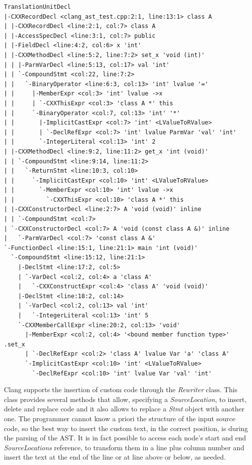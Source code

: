 \documentclass[a4paper,12pt,oneside]{book}
\begin{document}
\begin{lstlisting}[language=AST, caption=Clang AST of the simple code., label=ast]
TranslationUnitDecl
|-CXXRecordDecl <clang_ast_test.cpp:2:1, line:13:1> class A
| |-CXXRecordDecl <line:2:1, col:7> class A
| |-AccessSpecDecl <line:3:1, col:7> public
| |-FieldDecl <line:4:2, col:6> x 'int'
| |-CXXMethodDecl <line:5:2, line:7:2> set_x 'void (int)'
| | |-ParmVarDecl <line:5:13, col:17> val 'int'
| | `-CompoundStmt <col:22, line:7:2>
| |   `-BinaryOperator <line:6:3, col:13> 'int' lvalue '='
| |     |-MemberExpr <col:3> 'int' lvalue ->x
| |     | `-CXXThisExpr <col:3> 'class A *' this
| |     `-BinaryOperator <col:7, col:13> 'int' '*'
| |       |-ImplicitCastExpr <col:7> 'int' <LValueToRValue>
| |       | `-DeclRefExpr <col:7> 'int' lvalue ParmVar 'val' 'int'
| |       `-IntegerLiteral <col:13> 'int' 2
| |-CXXMethodDecl <line:9:2, line:11:2> get_x 'int (void)'
| | `-CompoundStmt <line:9:14, line:11:2>
| |   `-ReturnStmt <line:10:3, col:10>
| |     `-ImplicitCastExpr <col:10> 'int' <LValueToRValue>
| |       `-MemberExpr <col:10> 'int' lvalue ->x
| |         `-CXXThisExpr <col:10> 'class A *' this
| |-CXXConstructorDecl <line:2:7> A 'void (void)' inline
| | `-CompoundStmt <col:7>
| `-CXXConstructorDecl <col:7> A 'void (const class A &)' inline
|   `-ParmVarDecl <col:7> 'const class A &'
`-FunctionDecl <line:15:1, line:21:1> main 'int (void)'
  `-CompoundStmt <line:15:12, line:21:1>
    |-DeclStmt <line:17:2, col:5>
    | `-VarDecl <col:2, col:4> a 'class A'
    |   `-CXXConstructExpr <col:4> 'class A' 'void (void)'
    |-DeclStmt <line:18:2, col:14>
    | `-VarDecl <col:2, col:13> val 'int'
    |   `-IntegerLiteral <col:13> 'int' 5
    `-CXXMemberCallExpr <line:20:2, col:13> 'void'
      |-MemberExpr <col:2, col:4> '<bound member function type>' .set_x
      | `-DeclRefExpr <col:2> 'class A' lvalue Var 'a' 'class A'
      `-ImplicitCastExpr <col:10> 'int' <LValueToRValue>
        `-DeclRefExpr <col:10> 'int' lvalue Var 'val' 'int'
\end{lstlisting}


Clang supports the insertion of custom code through the \emph{Rewriter} class. This class provides several methods that allow, specifying a \emph{SourceLocation}, to insert, delete and replace code and it also allows to replace a \emph{Stmt} object with another one. The programmer cannot know a priori the structure of the input source code, so the best way to insert the custom text, in the correct position, is during the parsing of the AST. It is in fact possible to access each node’s start and end \emph{SourceLocations} reference, to transform them in a line plus column number and insert the text at the end of the line or at line above or below, as needed. 
\end{document}
